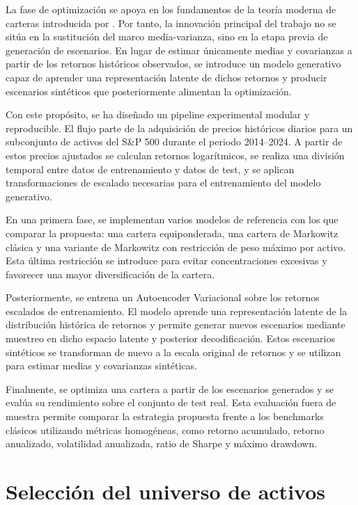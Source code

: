 La fase de optimización se apoya en los fundamentos de la teoría moderna de carteras introducida por \cite{markowitz1952}. Por tanto, la innovación principal del trabajo no se sitúa en la sustitución del marco media-varianza, sino en la etapa previa de generación de escenarios. En lugar de estimar únicamente medias y covarianzas a partir de los retornos históricos observados, se introduce un modelo generativo capaz de aprender una representación latente de dichos retornos y producir escenarios sintéticos que posteriormente alimentan la optimización.

Con este propósito, se ha diseñado un pipeline experimental modular y reproducible. El flujo parte de la adquisición de precios históricos diarios para un subconjunto de activos del S\&P 500 durante el periodo 2014--2024. A partir de estos precios ajustados se calculan retornos logarítmicos, se realiza una división temporal entre datos de entrenamiento y datos de test, y se aplican transformaciones de escalado necesarias para el entrenamiento del modelo generativo.

En una primera fase, se implementan varios modelos de referencia con los que comparar la propuesta: una cartera equiponderada, una cartera de Markowitz clásica y una variante de Markowitz con restricción de peso máximo por activo. Esta última restricción se introduce para evitar concentraciones excesivas y favorecer una mayor diversificación de la cartera.

Posteriormente, se entrena un Autoencoder Variacional sobre los retornos escalados de entrenamiento. El modelo aprende una representación latente de la distribución histórica de retornos y permite generar nuevos escenarios mediante muestreo en dicho espacio latente y posterior decodificación. Estos escenarios sintéticos se transforman de nuevo a la escala original de retornos y se utilizan para estimar medias y covarianzas sintéticas.

Finalmente, se optimiza una cartera a partir de los escenarios generados y se evalúa su rendimiento sobre el conjunto de test real. Esta evaluación fuera de muestra permite comparar la estrategia propuesta frente a los benchmarks clásicos utilizando métricas homogéneas, como retorno acumulado, retorno anualizado, volatilidad anualizada, ratio de Sharpe y máximo drawdown.

\section{Selección del universo de activos}

